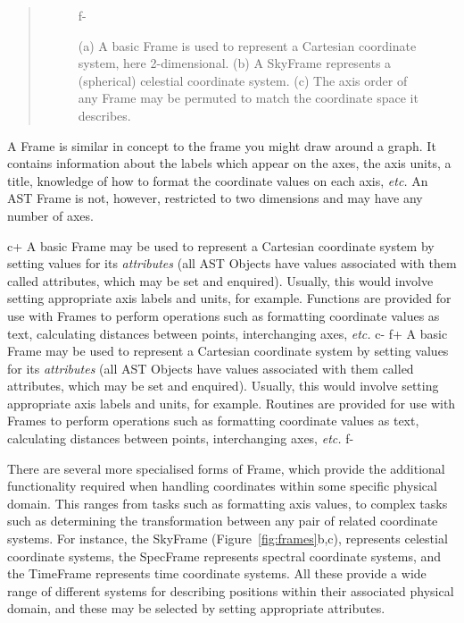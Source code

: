 \documentclass[twoside,11pt]{article}
\begin{document}
\begin{htmlonly}
\begin{quote}
\begin{figure}
f-
   \caption{(a) A basic Frame is used to represent a Cartesian coordinate
   system, here 2-dimensional. (b) A SkyFrame represents a (spherical)
   celestial coordinate system. (c) The axis order of any Frame may be
   permuted to match the coordinate space it describes.}
   \end{figure}
   \end{quote}
\end{htmlonly}
A Frame is similar in concept to the frame you might draw around a
graph.  It contains information about the labels which appear on the
axes, the axis units, a title, knowledge of how to format the
coordinate values on each axis, {\em{etc.}}  An AST Frame is not,
however, restricted to two dimensions and may have any number of axes.

c+
A basic Frame may be used to represent a Cartesian coordinate system
by setting values for its {\em attributes} (all AST Objects have
values associated with them called attributes, which may be set and
enquired).  Usually, this would involve setting appropriate axis
labels and units, for example.  Functions are provided for use with
Frames to perform operations such as formatting coordinate values as
text, calculating distances between points, interchanging axes,
{\em{etc.}}
c-
f+
A basic Frame may be used to represent a Cartesian coordinate system
by setting values for its {\em attributes} (all AST Objects have
values associated with them called attributes, which may be set and
enquired).  Usually, this would involve setting appropriate axis
labels and units, for example.  Routines are provided for use with
Frames to perform operations such as formatting coordinate values as
text, calculating distances between points, interchanging axes,
{\em{etc.}}
f-

There are several more specialised forms of Frame, which provide the
additional functionality required when handling coordinates within some
specific physical domain. This ranges from tasks such as formatting axis
values, to complex tasks such as determining the transformation between
any pair of related coordinate systems. For instance, the SkyFrame
(Figure~\ref{fig:frames}b,c), represents celestial coordinate systems,
the SpecFrame represents spectral coordinate systems, and the TimeFrame
represents time coordinate systems. All these provide a wide range of
different systems for describing positions within their associated physical
domain, and these may be selected by setting appropriate attributes.
\end{document}
